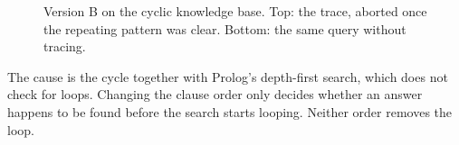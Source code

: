 \documentclass{article}
\begin{document}
\begin{figure}[!htb]
  \caption{Version B on the cyclic knowledge base. Top: the trace, aborted once the repeating pattern was clear. Bottom: the same query without tracing.}
  \label{fig:cycle-b}
\end{figure}

The cause is the cycle together with Prolog's depth-first search, which does not check for loops.
Changing the clause order only decides whether an answer happens to be found before the search starts looping.
Neither order removes the loop.
\end{document}
